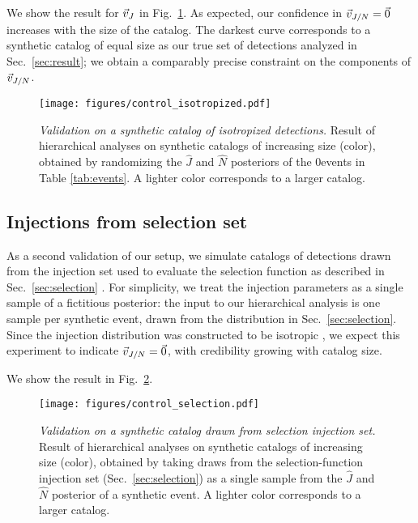 \documentclass[aps,prd,twocolumn,superscriptaddress,preprintnumbers,floatfix,nofootinbib]{revtex4-2}
\newcommand{\Nevents}{0}
\begin{document}
We show the result for $\vec{v}_{J}$ in Fig.~\ref{fig:control-iso}.
As expected, our confidence in $\vec{v}_{J/N} = \vec{0}$ increases with the size of the catalog.
The darkest curve corresponds to a synthetic catalog of equal size as our true set of detections analyzed in Sec.~\ref{sec:result}; we obtain a comparably precise constraint on the components of $\vec{v}_{J/N}$.

\begin{figure}
\texttt{[image: figures/control\_isotropized.pdf]}
\caption{\emph{Validation on a synthetic catalog of isotropized detections.}
Result of hierarchical analyses on synthetic catalogs of increasing size (color), obtained by randomizing the $\hat{J}$ and $\hat{N}$ posteriors of the \Nevents events in Table \ref{tab:events}.
A lighter color corresponds to a larger catalog.
}
\label{fig:control-iso}
\end{figure}

\subsection{Injections from selection set}
\label{sec:validation:selection}

As a second validation of our setup, we simulate catalogs of detections drawn from the injection set used to evaluate the selection function as described in Sec.~\ref{sec:selection} \cite{o3-selection}.
For simplicity, we treat the injection parameters as a single sample of a fictitious posterior: the input to our hierarchical analysis is one sample per synthetic event, drawn from the distribution in Sec.~\ref{sec:selection}.
Since the injection distribution was constructed to be isotropic \cite{o3-selection}, we expect this experiment to indicate $\vec{v}_{J/N} = \vec{0}$, with credibility growing with catalog size.

We show the result in Fig.~\ref{fig:control-sel}.

\begin{figure}
\texttt{[image: figures/control\_selection.pdf]}
\caption{\emph{Validation on a synthetic catalog drawn from selection injection set.}
Result of hierarchical analyses on synthetic catalogs of increasing size (color), obtained by taking draws from the selection-function injection set (Sec.~\ref{sec:selection}) as a single sample from the $\hat{J}$ and $\hat{N}$ posterior of a synthetic event.
A lighter color corresponds to a larger catalog.
}
\label{fig:control-sel}
\end{figure}
\end{document}
